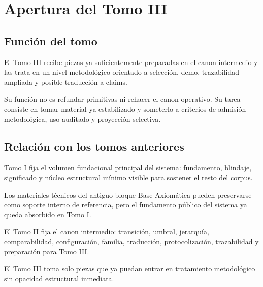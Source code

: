 \chapter{Apertura del Tomo III}

\section{Función del tomo}
\begin{observation}
El Tomo III recibe piezas ya suficientemente preparadas en el canon intermedio y las trata en un nivel metodológico orientado a selección, demo, trazabilidad ampliada y posible traducción a claims.
\end{observation}

\begin{observation}
Su función no es refundar primitivas ni rehacer el canon operativo. Su tarea consiste en tomar material ya estabilizado y someterlo a criterios de admisión metodológica, uso auditado y proyección selectiva.
\end{observation}

\section{Relación con los tomos anteriores}
\begin{observation}
Tomo I fija el volumen fundacional principal del sistema: fundamento, blindaje, significado y núcleo estructural mínimo visible para sostener el resto del corpus.
\end{observation}

\begin{observation}
Los materiales técnicos del antiguo bloque Base Axiomática pueden preservarse como soporte interno de referencia, pero el fundamento público del sistema ya queda absorbido en Tomo I.
\end{observation}

\begin{observation}
El Tomo II fija el canon intermedio: transición, umbral, jerarquía, comparabilidad, configuración, familia, traducción, protocolización, trazabilidad y preparación para Tomo III.
\end{observation}

\begin{observation}
El Tomo III toma solo piezas que ya puedan entrar en tratamiento metodológico sin opacidad estructural inmediata.
\end{observation}

